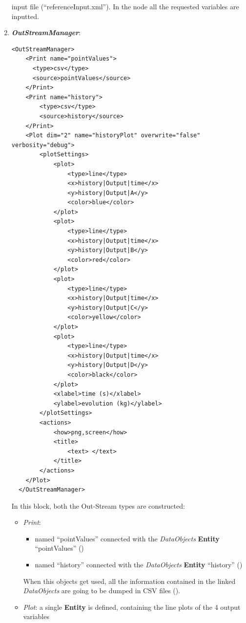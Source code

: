 \begin{enumerate}
   input file   (``referenceInput.xml''). In the  node all the requested variables are inputted.
   \item \textbf{\textit{OutStreamManager}}:   
\begin{lstlisting}[style=XML,morekeywords={arg,extension,pauseAtEnd,overwrite}]
  <OutStreamManager>
    <Print name="pointValues">
      <type>csv</type>
      <source>pointValues</source>
    </Print>
    <Print name="history">
        <type>csv</type>
        <source>history</source>
    </Print>
    <Plot dim="2" name="historyPlot" overwrite="false" verbosity="debug">
        <plotSettings>
            <plot>
                <type>line</type>
                <x>history|Output|time</x>
                <y>history|Output|A</y>
                <color>blue</color>
            </plot>
            <plot>
                <type>line</type>
                <x>history|Output|time</x>
                <y>history|Output|B</y>
                <color>red</color>
            </plot>
            <plot>
                <type>line</type>
                <x>history|Output|time</x>
                <y>history|Output|C</y>
                <color>yellow</color>
            </plot>
            <plot>
                <type>line</type>
                <x>history|Output|time</x>
                <y>history|Output|D</y>
                <color>black</color>
            </plot>
            <xlabel>time (s)</xlabel>
            <ylabel>evolution (kg)</ylabel>
        </plotSettings>
        <actions>
            <how>png,screen</how>
            <title>
                <text> </text>
            </title>
        </actions>
    </Plot>
  </OutStreamManager>
\end{lstlisting}
  In this block, both the Out-Stream types are constructed: 
  \begin{itemize}
    \item \textit{Print}: 
     \begin{itemize}
       \item named ``pointValues'' connected with the \textit{DataObjects} \textbf{Entity} ``pointValues'' 
                ()
       \item named ``history'' connected with the \textit{DataObjects} \textbf{Entity} ``history'' ()          
     \end{itemize}         
      When this objects get used, all the information contained in the linked  \textit{DataObjects} are going 
    to be dumped in CSV files ().
    \item \textit{Plot}: a single  \textbf{Entity} is defined, containing the line plots of the 4 output variables 

\end{itemize}
\end{enumerate}
